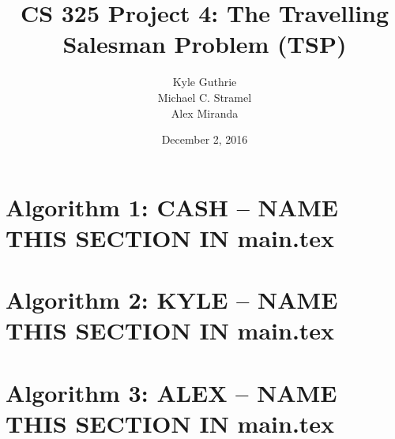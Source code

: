 \documentclass[12pt]{article}
\title{CS 325 Project 4: The Travelling Salesman Problem (TSP)}
\author{ Kyle Guthrie \\
         Michael C. Stramel \\
         Alex Miranda
}
\date{December 2, 2016}
\begin{document}
\maketitle
\newpage

\section*{Algorithm 1: CASH -- NAME THIS SECTION IN main.tex}

\newpage

\section*{Algorithm 2: KYLE -- NAME THIS SECTION IN main.tex}

\newpage

\section*{Algorithm 3: ALEX -- NAME THIS SECTION IN main.tex}

\newpage

\printbibliography
\end{document}

